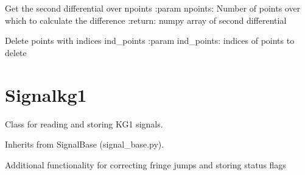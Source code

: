 \documentclass[letterpaper,10pt,english]{sphinxmanual}
\begin{document}
\begin{fulllineitems}
\begin{fulllineitems}
\end{fulllineitems}


\begin{fulllineitems}
\label{signal_base:signal_base.SignalBase.get_second_differences}
Get the second differential over npoints
:param npoints: Number of points over which to calculate the difference
:return: numpy array of second differential

\end{fulllineitems}


\begin{fulllineitems}
\label{signal_base:signal_base.SignalBase.delete_points}
Delete points with indices ind\_points
:param ind\_points: indices of points to delete

\end{fulllineitems}


\end{fulllineitems}



\section{Signalkg1}
\label{signal_kg1:signalkg1}\label{signal_kg1:module-signal_kg1}\label{signal_kg1::doc}
Class for reading and storing KG1 signals.

Inherits from SignalBase (signal\_base.py).

Additional functionality for correcting fringe 
jumps and storing status flags
\end{document}
